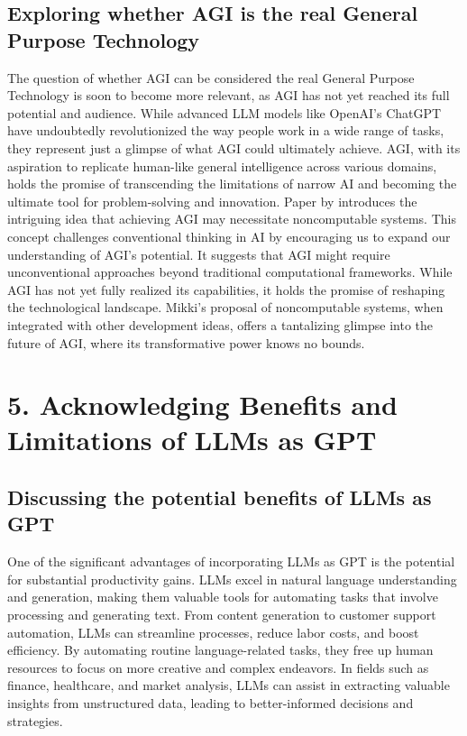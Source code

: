 \documentclass[preprint, 3p,
authoryear]{elsarticle} %
\begin{document}
\hypertarget{exploring-whether-agi-is-the-real-general-purpose-technology}{%
\subsection{Exploring whether AGI is the real General Purpose
Technology}\label{exploring-whether-agi-is-the-real-general-purpose-technology}}

The question of whether AGI can be considered the real General Purpose
Technology is soon to become more relevant, as AGI has not yet reached
its full potential and audience. While advanced LLM models like OpenAI's
ChatGPT have undoubtedly revolutionized the way people work in a wide
range of tasks, they represent just a glimpse of what AGI could
ultimately achieve. AGI, with its aspiration to replicate human-like
general intelligence across various domains, holds the promise of
transcending the limitations of narrow AI and becoming the ultimate tool
for problem-solving and innovation. Paper by
\citep{Mikki2023ArtificialGI} introduces the intriguing idea that
achieving AGI may necessitate noncomputable systems. This concept
challenges conventional thinking in AI by encouraging us to expand our
understanding of AGI's potential. It suggests that AGI might require
unconventional approaches beyond traditional computational frameworks.
While AGI has not yet fully realized its capabilities, it holds the
promise of reshaping the technological landscape. Mikki's proposal of
noncomputable systems, when integrated with other development ideas,
offers a tantalizing glimpse into the future of AGI, where its
transformative power knows no bounds.

\hypertarget{acknowledging-benefits-and-limitations-of-llms-as-gpt}{%
\section{5. Acknowledging Benefits and Limitations of LLMs as
GPT}\label{acknowledging-benefits-and-limitations-of-llms-as-gpt}}

\hypertarget{discussing-the-potential-benefits-of-llms-as-gpt}{%
\subsection{Discussing the potential benefits of LLMs as
GPT}\label{discussing-the-potential-benefits-of-llms-as-gpt}}

One of the significant advantages of incorporating LLMs as GPT is the
potential for substantial productivity gains. LLMs excel in natural
language understanding and generation, making them valuable tools for
automating tasks that involve processing and generating text. From
content generation to customer support automation, LLMs can streamline
processes, reduce labor costs, and boost efficiency. By automating
routine language-related tasks, they free up human resources to focus on
more creative and complex endeavors. In fields such as finance,
healthcare, and market analysis, LLMs can assist in extracting valuable
insights from unstructured data, leading to better-informed decisions
and strategies.
\end{document}
